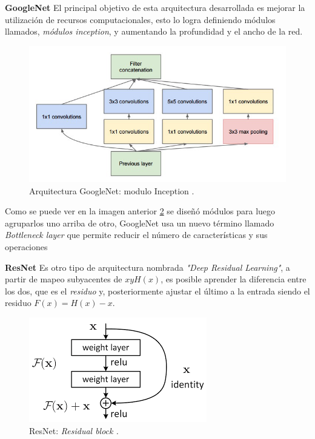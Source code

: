\par \textbf{GoogleNet} \citep{googlenet} El principal objetivo de esta arquitectura desarrollada es mejorar la utilización de recursos computacionales, esto lo logra definiendo módulos llamados, \textit{módulos inception}, y aumentando la profundidad y el ancho de la red. 
\begin{figure}[H]
 \centering
  \includegraphics[scale=0.5,keepaspectratio=true,clip=true]{imagenes/MarcoTeorico/inception-1.jpg}
  \caption{Arquitectura GoogleNet: modulo Inception \citep{googlenet}.}
  	\label{Fig:inception}
\end{figure}
Como se puede ver en la imagen anterior \ref{Fig:inception} se diseñó módulos para luego agruparlos uno arriba de otro, GoogleNet usa un nuevo término llamado \textit{Bottleneck layer} que permite reducir el número de características y sus operaciones 

\par \textbf{ResNet} \citep{resnet_a} Es otro tipo de arquitectura nombrada \textit{"Deep Residual Learning"}, a partir de mapeo subyacentes de $x y H (x)$, es posible aprender la diferencia entre los dos, que es el \textit{residuo} y, posteriormente ajustar el último a la entrada siendo el residuo $F(x) = H(x) - x$.

\begin{figure}[H]
 \centering
  \includegraphics[scale=0.6,keepaspectratio=true,clip=true]{imagenes/MarcoTeorico/resnet.png}
  \caption{ResNet: \textit{Residual block \citep{resnet_a}.}}
	\label{Fig:inception}
\end{figure}


